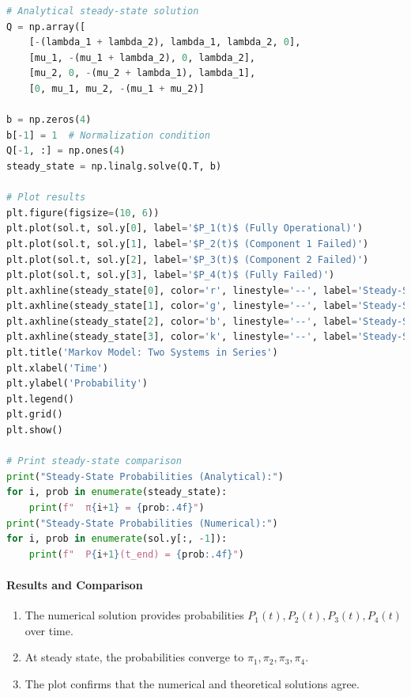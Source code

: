 \documentclass[a4paper,12pt]{article}
\begin{document}
\begin{answerbox}
\begin{lstlisting}[language=Python, caption=Numerical Solution for Two-Series System]
# Analytical steady-state solution
Q = np.array([
	[-(lambda_1 + lambda_2), lambda_1, lambda_2, 0],
	[mu_1, -(mu_1 + lambda_2), 0, lambda_2],
	[mu_2, 0, -(mu_2 + lambda_1), lambda_1],
	[0, mu_1, mu_2, -(mu_1 + mu_2)]
	
b = np.zeros(4)
b[-1] = 1  # Normalization condition
Q[-1, :] = np.ones(4)
steady_state = np.linalg.solve(Q.T, b)

# Plot results
plt.figure(figsize=(10, 6))
plt.plot(sol.t, sol.y[0], label='$P_1(t)$ (Fully Operational)')
plt.plot(sol.t, sol.y[1], label='$P_2(t)$ (Component 1 Failed)')
plt.plot(sol.t, sol.y[2], label='$P_3(t)$ (Component 2 Failed)')
plt.plot(sol.t, sol.y[3], label='$P_4(t)$ (Fully Failed)')
plt.axhline(steady_state[0], color='r', linestyle='--', label='Steady-State $\\pi_1$')
plt.axhline(steady_state[1], color='g', linestyle='--', label='Steady-State $\\pi_2$')
plt.axhline(steady_state[2], color='b', linestyle='--', label='Steady-State $\\pi_3$')
plt.axhline(steady_state[3], color='k', linestyle='--', label='Steady-State $\\pi_4$')
plt.title('Markov Model: Two Systems in Series')
plt.xlabel('Time')
plt.ylabel('Probability')
plt.legend()
plt.grid()
plt.show()

# Print steady-state comparison
print("Steady-State Probabilities (Analytical):")
for i, prob in enumerate(steady_state):
	print(f"  π{i+1} = {prob:.4f}")
print("Steady-State Probabilities (Numerical):")
for i, prob in enumerate(sol.y[:, -1]):
	print(f"  P{i+1}(t_end) = {prob:.4f}")
\end{lstlisting}


\paragraph{Results and Comparison}
\begin{enumerate}
	\item 
	The numerical solution provides probabilities \( P_1(t), P_2(t), P_3(t), P_4(t) \) over time.
	
	\item 
	At steady state, the probabilities converge to \( \pi_1, \pi_2, \pi_3, \pi_4 \).
	
	\item 
	The plot confirms that the numerical and theoretical solutions agree.
\end{enumerate}
\end{answerbox}
\newpage
\end{document}
